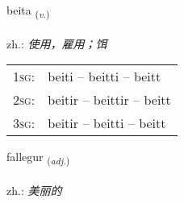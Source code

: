 \documentclass[frontgrid, backgrid]{flacards}\usepackage[]{graphicx}\usepackage[]{xcolor}
\begin{document}
\renewcommand{\blhead}{\vskip5pt {\small\bfseries\footnotesize Sagnorð | 动词 }}
\renewcommand{\bcfoot}{\vskip5pt \hspace{2pt}{\small\bfseries\footnotesize 1K}}


{beita \small{\textsubscript{(\textit{v.})}} \\[1ex] %
\textphonetic{[peiːta]} \\
zh.: \emph{使用，雇用；饵} \\  [2ex]
\renewcommand*{\arraystretch}{0.8}
\begin{tabular}{p{1cm}l}
\textsc{1sg}: & beiti -- beitti -- beitt \\ 
\textsc{2sg}: & beitir -- beittir -- beitt \\ 
\textsc{3sg}: & beitir -- beitti -- beitt \\ 
\end{tabular}
}

\renewcommand{\flhead}{\vskip5pt \fboxsep=0pt {\small\bfseries\footnotesize Lýsingarorð | 形容词}}
\renewcommand{\fcfoot}{\vskip5pt \fboxsep=0pt \hspace{2pt}{\small\bfseries\footnotesize 1K}}

\renewcommand{\blhead}{\vskip5pt {\small\bfseries\footnotesize Lýsingarorð | 形容词 }}
\renewcommand{\bcfoot}{\vskip5pt \hspace{2pt}{\small\bfseries\footnotesize 1K}}


{fallegur \small{\textsubscript{(\textit{adj.})}} \\[1ex] %
\textphonetic{[fatlɛɣʏr]} \\
zh.: \emph{美丽的} \\  [2ex]
\renewcommand*{\arraystretch}{0.8}
}
\end{document}

